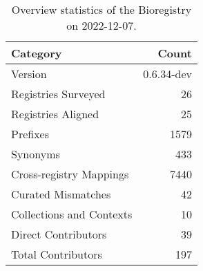 \begin{table}
\centering
\caption{Overview statistics of the Bioregistry on 2022-12-07.}
\label{tab:bioregistry-summary}
\begin{tabular}{lr}
\toprule
                Category &      Count \\
\midrule
                 Version & 0.6.34-dev \\
     Registries Surveyed &         26 \\
      Registries Aligned &         25 \\
                Prefixes &       1579 \\
                Synonyms &        433 \\
 Cross-registry Mappings &       7440 \\
      Curated Mismatches &         42 \\
Collections and Contexts &         10 \\
     Direct Contributors &         39 \\
      Total Contributors &        197 \\
\bottomrule
\end{tabular}
\end{table}
